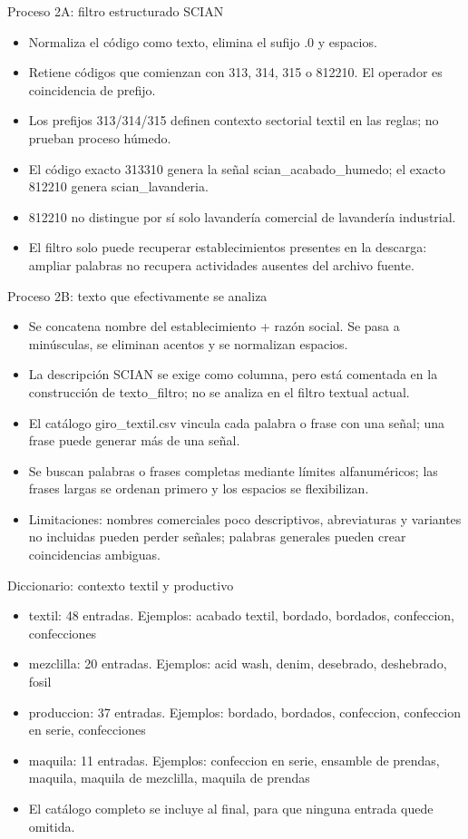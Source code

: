 \documentclass[aspectratio=169,10pt]{beamer}
\begin{document}
\begin{frame}{Proceso 2A: filtro estructurado SCIAN}
\small
\begin{itemize}
\item Normaliza el código como texto, elimina el sufijo .0 y espacios.
\item Retiene códigos que comienzan con 313, 314, 315 o 812210. El operador es coincidencia de prefijo.
\item Los prefijos 313/314/315 definen contexto sectorial textil en las reglas; no prueban proceso húmedo.
\item El código exacto 313310 genera la señal scian\_acabado\_humedo; el exacto 812210 genera scian\_lavanderia.
\item 812210 no distingue por sí solo lavandería comercial de lavandería industrial.
\item El filtro solo puede recuperar establecimientos presentes en la descarga: ampliar palabras no recupera actividades ausentes del archivo fuente.
\end{itemize}
\end{frame}
\begin{frame}{Proceso 2B: texto que efectivamente se analiza}
\small
\begin{itemize}
\item Se concatena nombre del establecimiento + razón social. Se pasa a minúsculas, se eliminan acentos y se normalizan espacios.
\item La descripción SCIAN se exige como columna, pero está comentada en la construcción de texto\_filtro; no se analiza en el filtro textual actual.
\item El catálogo giro\_textil.csv vincula cada palabra o frase con una señal; una frase puede generar más de una señal.
\item Se buscan palabras o frases completas mediante límites alfanuméricos; las frases largas se ordenan primero y los espacios se flexibilizan.
\item Limitaciones: nombres comerciales poco descriptivos, abreviaturas y variantes no incluidas pueden perder señales; palabras generales pueden crear coincidencias ambiguas.
\end{itemize}
\end{frame}
\begin{frame}{Diccionario: contexto textil y productivo}
\small
\begin{itemize}
\item textil: 48 entradas. Ejemplos: acabado textil, bordado, bordados, confeccion, confecciones
\item mezclilla: 20 entradas. Ejemplos: acid wash, denim, desebrado, deshebrado, fosil
\item produccion: 37 entradas. Ejemplos: bordado, bordados, confeccion, confeccion en serie, confecciones
\item maquila: 11 entradas. Ejemplos: confeccion en serie, ensamble de prendas, maquila, maquila de mezclilla, maquila de prendas
\item El catálogo completo se incluye al final, para que ninguna entrada quede omitida.
\end{itemize}
\end{frame}
\end{document}
